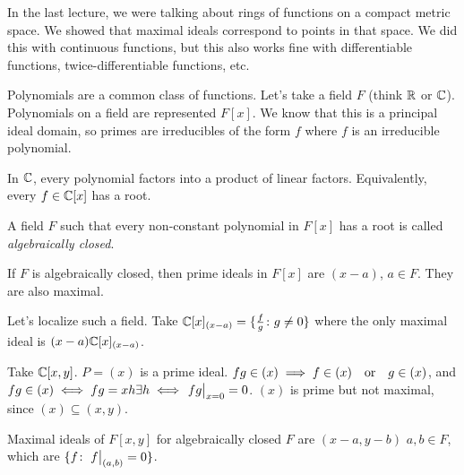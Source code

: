 \documentclass[a4paper,twoside,master.tex]{subfiles}
\begin{document}

In the last lecture, we were talking about rings of functions on a compact metric space. We showed that maximal ideals correspond to points in that space. We did this with continuous functions, but this also works fine with differentiable functions, twice-differentiable functions, etc.

Polynomials are a common class of functions. Let's take a field $ F $ (think $ \mathbb{R} $ or $ \mathbb{C} $). Polynomials on a field are represented $ F[x] $. We know that this is a principal ideal domain, so primes are irreducibles of the form $ f $ where $ f $ is an irreducible polynomial.

\begin{theorem}
    In $ \mathbb{C} $, every polynomial factors into a product of linear factors. Equivalently, every $ f \in \mathbb{C}[x] $ has a root.
\end{theorem}

\begin{definition}
    A field $ F $ such that every non-constant polynomial in $ F[x] $ has a root is called \textit{algebraically closed}.
\end{definition}

If $ F $ is algebraically closed, then prime ideals in $ F[x] $ are $ (x-a) $, $ a \in F $. They are also maximal.

Let's localize such a field. Take $ \mathbb{C}[x]_{(x-a)} = \{\frac{f}{g} \colon g \neq 0\}  $ where the only maximal ideal is $ (x-a)\mathbb{C}[x]_{(x-a)} $.
\begin{ex}
    Take $ \mathbb{C}[x,y] $. $ P = (x) $ is a prime ideal. $ fg \in (x) \implies f \in (x) \qor g \in (x) $, and $ fg \in (x) \iff fg = xh \exists h \iff \eval{fg}_{x=0} = 0 $. $ (x) $ is prime but not maximal, since $ (x) \subseteq (x,y) $.
    
    Maximal ideals of $ F[x,y] $ for algebraically closed $ F $ are $ (x-a, y-b) $ $ a, b \in F $, which are $ \{f\colon \eval{f}_{(a,b)} = 0\} $.
\end{ex}
\end{document}
